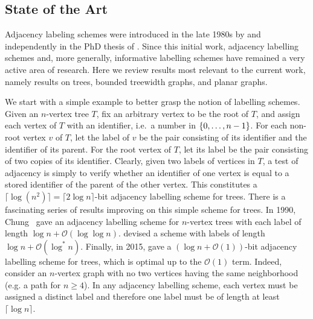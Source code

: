 \documentclass{patmorin}
\renewcommand{\geq}{\geqslant}
\newcommand{\vida}[1]{\noindent{\color{pink} VD: #1}}
\newcommand{\pat}[1]{\noindent\textcolor{Magenta}{PaMo: #1}}
\newcommand{\Oh}{\calO}
\DeclarePairedDelimiter{\set}{\{}{\}}
\newcommand{\calO}{\mathcal{O}}
\begin{document}
\subsection{State of the Art}
\label{ssec:state-of-art}

Adjacency labeling schemes were introduced in the late 1980s
by \citet{kannan.naor.ea:implicit} and independently in the PhD thesis of \citet{muller:local}. Since this initial work, adjacency labelling schemes and, more generally, informative labelling schemes have remained a very active area of research.
Here we review results most relevant to the current work, namely results on trees, bounded treewidth graphs, and planar
graphs.

We start with a simple example to better grasp the notion of labelling schemes.
Given an $n$-vertex tree $T$, fix an arbitrary vertex to be the root of $T$, and assign each vertex of $T$ with an identifier, i.e.\ a number in $\set{0,\ldots,n-1}$.
For each non-root vertex $v$ of $T$,
let the label of $v$ be
the pair consisting of its identifier and the identifier of its parent.
For the root vertex of $T$, let its label be
the pair consisting of two copies of its identifier.
Clearly, given two labels of vertices in $T$,
a test of adjacency is simply to verify whether an identifier of one vertex is equal to a stored identifier of the parent of the other vertex.
This constitutes a $\lceil\log(n^2)\rceil=\lceil2\log n\rceil$-bit adjacency labelling scheme for trees.
There is a fascinating series of results improving on this simple scheme for trees. In 1990, Chung~\cite{chung:universal} gave an adjacency labelling scheme for $n$-vertex trees with each label of length $\log n +\Oh(\log\log n)$.
\citet{alstrup.rauhe:improved} devised a scheme with labels of length $\log n+\Oh(\log^*n)$.
Finally, in 2015,
\citet{alstrup.dahlgaard.ea:optimal} gave a $(\log n + \Oh(1))$-bit adjacency labelling scheme for trees, which is optimal up to the $\Oh(1)$ term.
Indeed, consider an $n$-vertex graph with no two vertices having the same neighborhood (e.g. a path for $n\geq4$).
In any adjacency labelling scheme, each vertex must be assigned a distinct label and therefore one label must be of length at least $\lceil\log n\rceil$.
\end{document}
